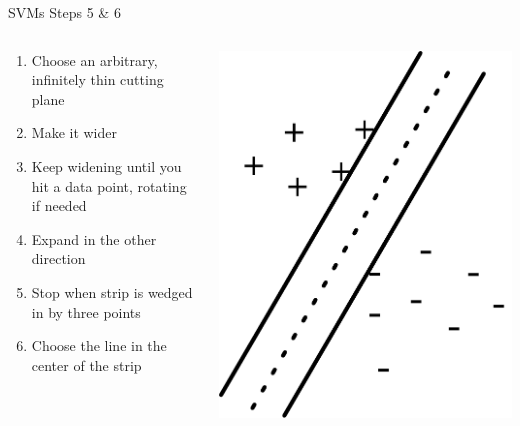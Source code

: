\documentclass[aspectratio=169]{beamer}
\begin{document}
\begin{frame}{SVMs Steps 5 \& 6}

\begin{columns}[T]
\begin{column}{0.6\textwidth}
\begin{enumerate}
\item  Choose an arbitrary, infinitely thin cutting plane
\item Make it wider
\item Keep widening until you hit a data point, rotating if needed
\item Expand in the other direction
\item Stop when strip is wedged in by three points
\item Choose the line in the center of the strip
\end{enumerate}
\end{column}
\begin{column}{0.4\textwidth}
\includegraphics[width=1\textwidth]{lectSVM/svm7}
\end{column}
\end{columns}
\end{frame}
\end{document}
